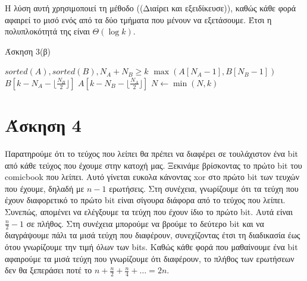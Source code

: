 \documentclass[11pt,a4paper]{book}
\begin{document}
Η λύση αυτή χρησιμοποιεί τη μέθοδο ((Διαίρει και εξειδίκευσε)), καθώς κάθε φορά αφαιρεί το μισό ενός από τα δύο τμήματα που μένουν να εξετάσουμε. Έτσι η πολυπλοκότητά της είναι $\Theta( \log k )$.

\begin{algorithm}[H]
\caption{\textgreek{Άσκηση 3(β)}}
\begin{algorithmic}[1]
\Require $sorted(A), sorted(B), N_A + N_B \geq k$
        \State \Return $\max( A[ N_A - 1 ], B[ N_B - 1 ] )$
    \EndIf
            \State \Return {}
        \EndIf
        \State \Return $B[ k - N_A - \lfloor \frac{N_B}{2} \rfloor ]$
    \Else
            \State \Return {}
        \EndIf
        \State \Return $A[ k - N_B - \lfloor \frac{N_A}{2} \rfloor ]$
    \EndIf
\EndProcedure
{}
	\State $N \gets \min(N, k)$
	\State \Return {}
\EndProcedure
\end{algorithmic}
\end{algorithm}

        
\section*{Άσκηση 4}
Παρατηρούμε ότι το τεύχος που λείπει θα πρέπει να διαφέρει σε τουλάχιστον ένα \textlatin{bit} από κάθε τεύχος που έχουμε στην κατοχή μας. Ξεκινάμε βρίσκοντας το πρώτο \textlatin{bit} του \textlatin{comicbook} που λείπει. Αυτό γίνεται ευκολα κάνοντας \textlatin{xor} στο πρώτο \textlatin{bit} των τευχών που έχουμε, δηλαδή με $n - 1$ ερωτήσεις. Στη συνέχεια, γνωρίζουμε ότι τα τεύχη που έχουν διαφορετικό το πρώτο \textlatin{bit} είναι σίγουρα διάφορα από το τεύχος που λείπει. Συνεπώς, απομένει να ελέγξουμε τα τεύχη που έχουν ίδιο το πρώτο \textlatin{bit}. Αυτά είναι $\frac{n}{2} - 1$ σε πλήθος. Στη συνέχεια μπορούμε να βρούμε το δεύτερο \textlatin{bit} και να διαγράψουμε πάλι τα μισά τεύχη που διαφέρουν, συνεχίζοντας έτσι τη διαδικασία έως ότου γνωρίζουμε την τιμή όλων των \textlatin{bits}. Καθώς κάθε φορά που μαθαίνουμε ένα \textlatin{bit} αφαιρούμε τα μισά τεύχη που γνωρίζουμε ότι διαφέρουν, το πλήθος των ερωτήσεων δεν θα ξεπεράσει ποτέ το $n + \frac{n}{2} + \frac{n}{4} + \dots = 2n$.
\end{document}
